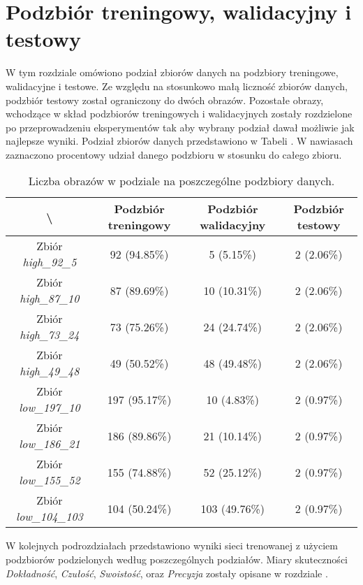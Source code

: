 \section{Podzbiór treningowy, walidacyjny i testowy}
\label{sec:podzial}
W tym rozdziale omówiono podział zbiorów danych na podzbiory treningowe, walidacyjne i testowe.
Ze względu na stosunkowo małą liczność zbiorów danych, podzbiór testowy został ograniczony do dwóch obrazów.
Pozostałe obrazy, wchodzące w skład podzbiorów treningowych i walidacyjnych zostały rozdzielone po przeprowadzeniu eksperymentów tak aby wybrany podział dawał możliwie jak najlepsze wyniki.
Podział zbiorów danych przedstawiono w Tabeli . W nawiasach zaznaczono procentowy udział danego podzbioru w stosunku do całego zbioru.

\begin{table}[H]
	\centering
	\caption{Liczba obrazów w podziale na poszczególne podzbiory danych.}
	\vspace{6pt}
	{
    \footnotesize
    \begin{tabular}{|c|c|c|c|}
      \hline \textbackslash & Podzbiór treningowy & Podzbiór walidacyjny & Podzbiór testowy \\
      \hline Zbiór \textit{high\_92\_5} & 92 (94.85\%) & 5 (5.15\%) & 2 (2.06\%) \\
      \hline Zbiór \textit{high\_87\_10} & 87 (89.69\%) & 10 (10.31\%) & 2 (2.06\%) \\
      \hline Zbiór \textit{high\_73\_24} & 73 (75.26\%) & 24 (24.74\%) & 2 (2.06\%) \\
      \hline Zbiór \textit{high\_49\_48} & 49 (50.52\%) & 48 (49.48\%) & 2 (2.06\%) \\
      \hline
      \hline Zbiór \textit{low\_197\_10} & 197 (95.17\%) & 10 (4.83\%) & 2 (0.97\%) \\
      \hline Zbiór \textit{low\_186\_21} & 186 (89.86\%) & 21 (10.14\%) & 2 (0.97\%) \\
      \hline Zbiór \textit{low\_155\_52} & 155 (74.88\%) & 52 (25.12\%) & 2 (0.97\%) \\
      \hline Zbiór \textit{low\_104\_103} & 104 (50.24\%) & 103 (49.76\%) & 2 (0.97\%) \\
      \hline
    \end{tabular}
    \label{Tab:podzial}
	}
	\vspace{0pt}
\end{table}


W kolejnych podrozdziałach przedstawiono wyniki sieci trenowanej z użyciem podzbiorów podzielonych według poszczególnych podziałów.
Miary skuteczności \textit{Dokładność}, \textit{Czułość}, \textit{Swoistość}, oraz \textit{Precyzja} zostały opisane w rozdziale .

